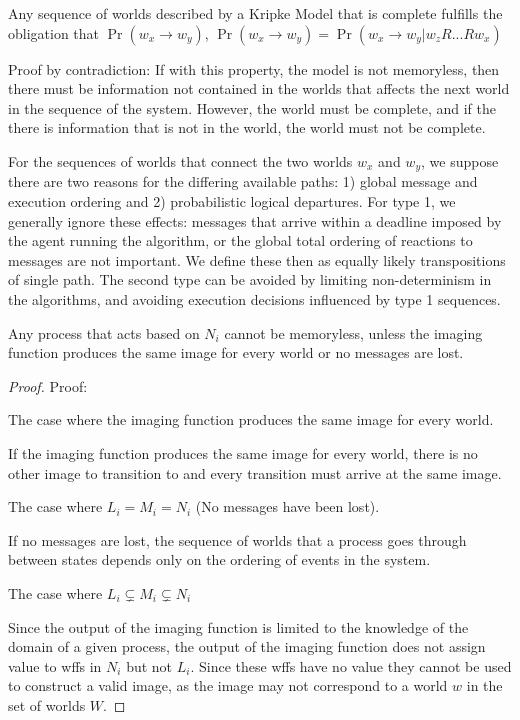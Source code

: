 \begin{cor}
Any sequence of worlds described by a Kripke Model that is complete fulfills the obligation that $\Pr(w_x \rightarrow w_y)$, $\Pr(w_x \rightarrow w_y) = \Pr(w_x \rightarrow w_y | w_{z}R...Rw_{x})$
\end{cor}

Proof by contradiction: If with this property, the model is not memoryless, then there must be information not contained in the worlds that affects the next world in the sequence of the system. However, the world must be complete, and if the there is information that is not in the world, the world must not be complete.

For the sequences of worlds that connect the two worlds $w_x$ and $w_y$, we suppose there are two reasons for the differing available paths: 1) global message and execution ordering and 2) probabilistic logical departures. For type 1, we generally ignore these effects: messages that arrive within a deadline imposed by the agent running the algorithm, or the global total ordering of reactions to messages are not important. We define these then as equally likely transpositions of single path. The second type can be avoided by limiting non-determinism in the algorithms, and avoiding execution decisions influenced by type 1 sequences.

\begin{thm}
Any process that acts based on $N_i$ cannot be memoryless, unless the imaging function produces the same image for every world or no messages are lost.
\end{thm}

\begin{proof}
Proof:
\begin{case}
The case where the imaging function produces the same image for every world.
\end{case}

If the imaging function produces the same image for every world, there is no other image to transition to and every transition must arrive at the same image.

\begin{case}
The case where $L_i = M_i = N_i$ (No messages have been lost).
\end{case}

If no messages are lost, the sequence of worlds that a process goes through between states depends only on the ordering of events in the system. 

\begin{case}
The case where $L_i \subsetneq M_i \subsetneq N_i$
\end{case}

Since the output of the imaging function is limited to the knowledge of the domain of a given process, the output of the imaging function does not assign value to wffs in $N_i$ but not $L_i$. Since these wffs have no value they cannot be used to construct a valid image, as the image may not correspond to a world $w$ in the set of worlds $W$.
\end{proof}

